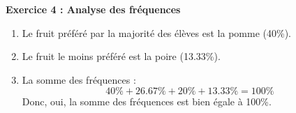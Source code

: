 \documentclass{article}
\begin{document}
\begin{tcolorbox}[colback=green!10!white, colframe=green!75!black, title=\textcolor{white}{Exercices}]
\vspace{0.5cm}

\textbf{Exercice 4 : Analyse des fréquences}
\begin{enumerate}
    \item Le fruit préféré par la majorité des élèves est la pomme (40\%).
    
    \item Le fruit le moins préféré est la poire (13.33\%).
    
    \item La somme des fréquences :
    \[
    40\% + 26.67\% + 20\% + 13.33\% = 100\%
    \]
    Donc, oui, la somme des fréquences est bien égale à 100\%.
\end{enumerate}

\end{tcolorbox}
\end{document}
